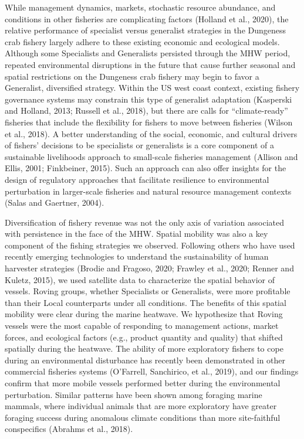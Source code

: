 \documentclass[]{elsarticle} %
\begin{document}
While management dynamics, markets, stochastic resource abundance, and
conditions in other fisheries are complicating factors (Holland et al.,
2020), the relative performance of specialist versus generalist
strategies in the Dungeness crab fishery largely adhere to these
existing economic and ecological models. Although some Specialists and
Generalists persisted through the MHW period, repeated environmental
disruptions in the future that cause further seasonal and spatial
restrictions on the Dungeness crab fishery may begin to favor a
Generalist, diversified strategy. Within the US west coast context,
existing fishery governance systems may constrain this type of
generalist adaptation (Kasperski and Holland, 2013; Russell et al.,
2018), but there are calls for ``climate-ready'' fisheries that include
the flexibility for fishers to move between fisheries (Wilson et al.,
2018). A better understanding of the social, economic, and cultural
drivers of fishers' decisions to be specialists or generalists is a core
component of a sustainable livelihoods approach to small-scale fisheries
management (Allison and Ellis, 2001; Finkbeiner, 2015). Such an approach
can also offer insights for the design of regulatory approaches that
facilitate resilience to environmental perturbation in larger-scale
fisheries and natural resource management contexts (Salas and Gaertner,
2004).

Diversification of fishery revenue was not the only axis of variation
associated with persistence in the face of the MHW. Spatial mobility was
also a key component of the fishing strategies we observed. Following
others who have used recently emerging technologies to understand the
sustainability of human harvester strategies (Brodie and Fragoso, 2020;
Frawley et al., 2020; Renner and Kuletz, 2015), we used satellite data
to characterize the spatial behavior of vessels. Roving groups, whether
Specialists or Generalists, were more profitable than their Local
counterparts under all conditions. The benefits of this spatial mobility
were clear during the marine heatwave. We hypothesize that Roving
vessels were the most capable of responding to management actions,
market forces, and ecological factors (e.g., product quantity and
quality) that shifted spatially during the heatwave. The ability of more
exploratory fishers to cope during an environmental disturbance has
recently been demonstrated in other commercial fisheries systems
(O'Farrell, Sanchirico, et al., 2019), and our findings confirm that
more mobile vessels performed better during the environmental
perturbation. Similar patterns have been shown among foraging marine
mammals, where individual animals that are more exploratory have greater
foraging success during anomalous climate conditions than more
site-faithful conspecifics (Abrahms et al., 2018).
\end{document}
